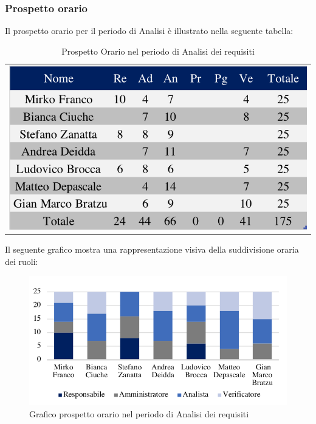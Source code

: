 \subsubsection{Prospetto orario}
Il prospetto orario per il periodo di Analisi è illustrato nella seguente tabella:

\begin{table}[!ht]
  \begin{center}  	
	\begin{tabular}{c}
		\includegraphics[scale=0.90]{images/tabellaProspettoOrario.png}
		\end{tabular}
		\caption{Prospetto Orario nel periodo di Analisi dei requisiti}
	\end{center}
	\end{table}
Il seguente grafico mostra una rappresentazione visiva della suddivisione oraria dei ruoli:
\begin{figure}[!ht]
	\begin{center}
	\includegraphics{images/grafoProspettoOrario.png}
	\caption{Grafico prospetto orario nel periodo di Analisi dei requisiti }
	\end{center}
\end{figure}

